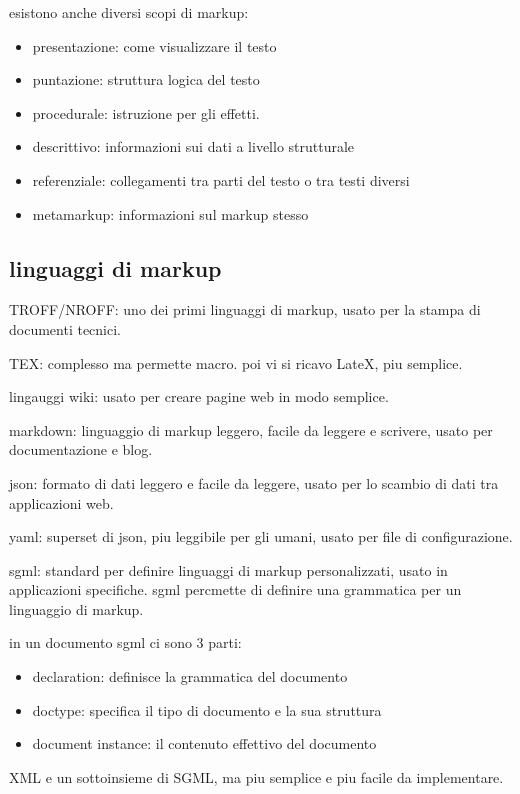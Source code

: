 \documentclass[12pt]{article}
\begin{document}
esistono anche diversi scopi di markup:
\begin{itemize}
    \item presentazione: come visualizzare il testo
    \item puntazione: struttura logica del testo
    \item procedurale: istruzione per gli effetti.
    \item descrittivo: informazioni sui dati a livello strutturale
    \item referenziale: collegamenti tra parti del testo o tra testi diversi
    \item metamarkup: informazioni sul markup stesso
\end{itemize}

\subsection{linguaggi di markup}
TROFF/NROFF: uno dei primi linguaggi di markup, usato per la stampa di documenti tecnici.

TEX: complesso ma permette macro. poi vi si ricavo LateX, piu semplice.

lingauggi wiki: usato per creare pagine web in modo semplice.

markdown: linguaggio di markup leggero, facile da leggere e scrivere, usato per documentazione e blog.

json: formato di dati leggero e facile da leggere, usato per lo scambio di dati tra applicazioni web.

yaml: superset di json, piu leggibile per gli umani, usato per file di configurazione.

sgml: standard per definire linguaggi di markup personalizzati, usato in applicazioni specifiche.
sgml percmette di definire una grammatica per un linguaggio di markup.

in un documento sgml ci sono 3 parti:
\begin{itemize}
    \item declaration: definisce la grammatica del documento
    \item doctype: specifica il tipo di documento e la sua struttura
    \item document instance: il contenuto effettivo del documento
\end{itemize}

XML e un sottoinsieme di SGML, ma piu semplice e piu facile da implementare.
\end{document}
